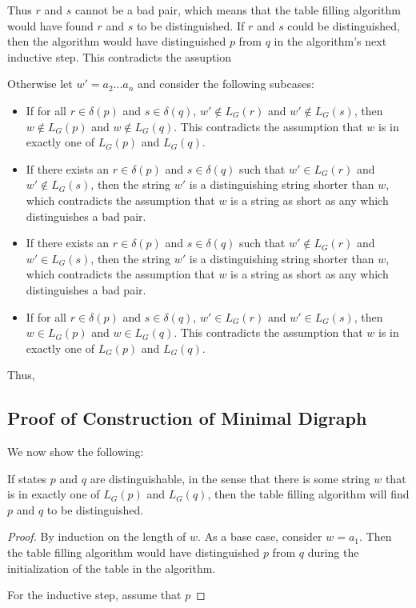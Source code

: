 Thus $r$ and $s$ cannot be a bad pair, which means that the table
filling algorithm would have found $r$ and $s$ to be distinguished.
If $r$ and $s$ could be distinguished, then the algorithm would
have distinguished $p$ from $q$ in the algorithm's next inductive step.
This contradicts the assuption 

\clearpage

Otherwise let $w'=a_2 ... a_n$ and consider the following subcases:
\begin{itemize}
    \item If for all $r \in \delta(p)$ and $s \in \delta(q)$,
    $w' \notin L_G(r)$ and $w' \notin L_G(s)$, then $w \notin L_G(p)$
    and $w \notin L_G(q)$. This contradicts the assumption that $w$
    is in exactly one of $L_G(p)$ and $L_G(q)$.
    \item If there exists an $r \in \delta(p)$ and $s \in \delta(q)$ such that
    $w' \in L_G(r)$ and $w' \notin L_G(s)$, then the string $w'$ is
    a distinguishing string shorter than $w$, which contradicts the
    assumption that $w$ is a string as short as any which
    distinguishes a bad pair.
    \item If there exists an $r \in \delta(p)$ and $s \in \delta(q)$ such that
    $w' \notin L_G(r)$ and $w' \in L_G(s)$, then the string $w'$ is
    a distinguishing string shorter than $w$, which contradicts the
    assumption that $w$ is a string as short as any which
    distinguishes a bad pair.
    \item If for all $r \in \delta(p)$ and $s \in \delta(q)$, $w' \in L_G(r)$
    and $w' \in L_G(s)$, then $w \in L_G(p)$ and $w \in L_G(q)$. This
    contradicts the assumption that $w$ is in exactly one of $L_G(p)$ and
    $L_G(q)$.
\end{itemize}

Thus,


\subsection{Proof of Construction of Minimal Digraph}

We now show the following:

\begin{theorem}
If states $p$ and $q$ are distinguishable, in the sense
that there is some string $w$ that is in exactly one of
$L_G(p)$ and $L_G(q)$, then the table filling algorithm
will find $p$ and $q$ to be distinguished.
\end{theorem}
\begin{proof}
By induction on the length of $w$. As a base case, consider
$w=a_1$. Then the table filling algorithm would have
distinguished $p$ from $q$ during the initialization of the
table in the algorithm.

For the inductive step, assume that $p$
\end{proof}



